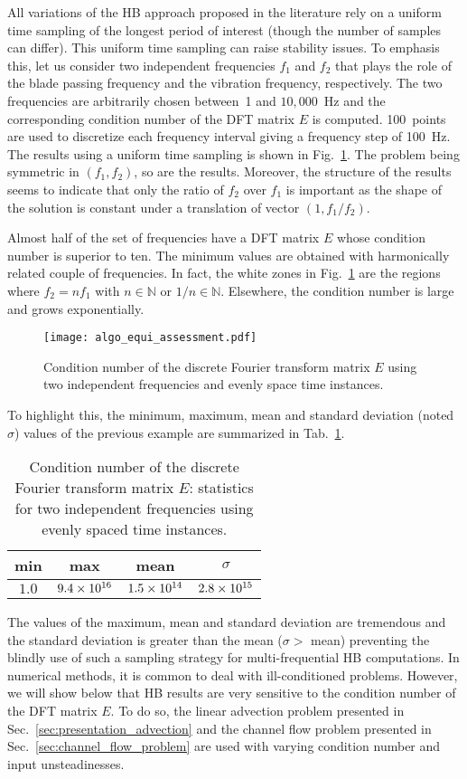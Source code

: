All variations of the HB approach proposed in the literature rely on 
a uniform time sampling of the longest period of interest 
(though the number of samples can differ). 
This uniform time sampling can raise stability issues.
To emphasis this, let us consider two independent frequencies $f_1$
and $f_2$ that plays the role of the blade passing frequency and
the vibration frequency, respectively. The two frequencies are arbitrarily chosen between~1
and $10,000$~Hz and the corresponding
condition number of the DFT matrix $E$ is computed. 
100~points are used to discretize each 
frequency interval giving a frequency step of 100~Hz.
The results using a uniform time
sampling is shown in Fig.~\ref{fig:algo_equi_assessment}.
The problem being symmetric in $(f_1, f_2)$, so are the results.
Moreover, the structure of the results seems to indicate that only the
ratio of $f_2$ over $f_1$ is important as the shape of the
solution is constant under a translation of vector $(1,f_1 / f_2)$.

Almost half of the set of frequencies have a DFT matrix $E$
whose condition number is superior to ten.
The minimum values are obtained with harmonically related couple
of frequencies. In fact, the white zones in Fig.~\ref{fig:algo_equi_assessment}
are the regions where $f_2 = n f_1$ with $n \in \mathbb{N}$ or $1/n \in \mathbb{N}$.
Elsewhere, the condition number is large and grows exponentially.
\begin{figure}[htp]
  \centering
  \texttt{[image: algo\_equi\_assessment.pdf]}
  \caption{Condition number of the discrete Fourier transform matrix $E$
  using two independent frequencies and evenly space time instances.}
  \label{fig:algo_equi_assessment}
\end{figure}
To highlight this, the minimum, maximum, mean and 
standard deviation (noted $\sigma$) values of the
previous example are summarized in Tab.~\ref{tab:hb_algo_equi}.
\begin{table}[htp]
  \centering
  \begin{tabular}{cccc}
    \toprule
    min & max & mean & $\sigma$ \\
    \midrule
    $1.0$ & $9.4\times 10^{16}$ & $1.5\times 10^{14}$ & $2.8\times 10^{15}$ \\
    \bottomrule
  \end{tabular}
  \caption{Condition number of the discrete Fourier transform matrix $E$: 
  statistics for two independent frequencies using evenly spaced time instances.}
  \label{tab:hb_algo_equi}
\end{table}  
The values of the maximum, mean and standard deviation are tremendous
and the standard deviation is greater than the mean
($\sigma > $ mean) preventing the blindly use of such a sampling strategy for 
multi-frequential HB computations.
In numerical methods, it is common to deal with ill-conditioned
problems. However, we will show below that HB results are 
very sensitive to the condition number of the DFT matrix $E$.
To do so, the linear advection problem
presented in Sec.~\ref{sec:presentation_advection}
and the channel flow problem presented in 
Sec.~\ref{sec:channel_flow_problem}
are used with varying condition number and input unsteadinesses.
